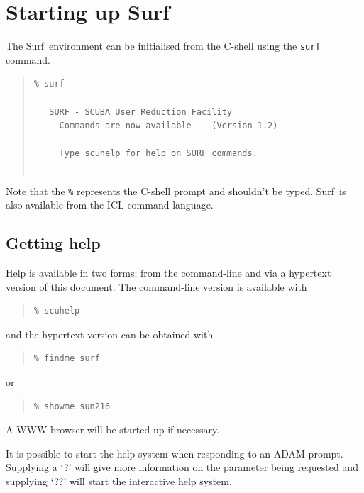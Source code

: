 \documentclass[twoside,11pt]{article}
\newcommand{\scusoft}          {{\sc Surf}}
\newenvironment{myquote}{\begin{quote}\begin{small}}{\end{small}\end{quote}}
\newcommand{\xlabel}[1]{}
\renewcommand{\_}{\texttt{\symbol{95}}}
\begin{document}
\section{\xlabel{startup}Starting up \scusoft \label{startup}}

The \scusoft\ environment can be initialised from the C-shell using the
\texttt{surf} command.

\begin{myquote}
\begin{verbatim}
% surf
 
   SURF - SCUBA User Reduction Facility
     Commands are now available -- (Version 1.2)
 
     Type scuhelp for help on SURF commands.
 
\end{verbatim}
\end{myquote}

Note that the \texttt{\%} represents the C-shell prompt and shouldn't be typed.
\scusoft\ is also available from the ICL command language.


\subsection{Getting help}

Help is available in two forms; from the command-line and via a hypertext 
version of this document. The command-line version is available with

\begin{myquote}
\begin{verbatim}
% scuhelp
\end{verbatim}
\end{myquote}

and the hypertext version can be obtained with

\begin{myquote}
\begin{verbatim}
% findme surf
\end{verbatim}
\end{myquote}
or
\begin{myquote}
\begin{verbatim}
% showme sun216
\end{verbatim}
\end{myquote}
A WWW browser will be started up if necessary.

It is possible to start the help system when responding to
an ADAM prompt. Supplying a `?' will give more information on the
parameter being requested and supplying `??' will start the interactive
help system.
\end{document}
